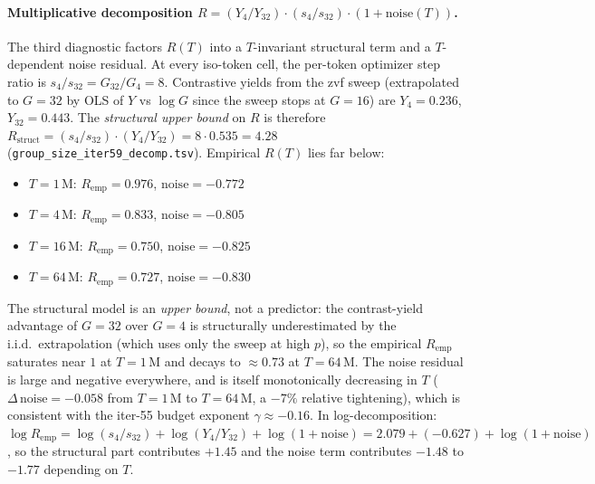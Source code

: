 \paragraph{Multiplicative decomposition $R = (Y_4/Y_{32}) \cdot (s_4/s_{32}) \cdot (1 + \mathrm{noise}(T))$.}
The third diagnostic factors $R(T)$ into a $T$-invariant structural
term and a $T$-dependent noise residual.  At every iso-token cell,
the per-token optimizer step ratio is
$s_4/s_{32} = G_{32}/G_4 = 8$.  Contrastive yields from the zvf
sweep (extrapolated to $G{=}32$ by OLS of $Y$ vs $\log G$ since the
sweep stops at $G{=}16$) are $Y_4 = 0.236$, $Y_{32} = 0.443$.  The
\emph{structural upper bound} on $R$ is therefore
$R_{\mathrm{struct}} = (s_4/s_{32}) \cdot (Y_4/Y_{32}) = 8 \cdot 0.535
= 4.28$ (\texttt{group\_size\_iter59\_decomp.tsv}).  Empirical
$R(T)$ lies far below:
\begin{itemize}
  \item $T = 1$\,M: $R_{\mathrm{emp}} = 0.976$, $\mathrm{noise} = -0.772$
  \item $T = 4$\,M: $R_{\mathrm{emp}} = 0.833$, $\mathrm{noise} = -0.805$
  \item $T = 16$\,M: $R_{\mathrm{emp}} = 0.750$, $\mathrm{noise} = -0.825$
  \item $T = 64$\,M: $R_{\mathrm{emp}} = 0.727$, $\mathrm{noise} = -0.830$
\end{itemize}
The structural model is an \emph{upper bound}, not a predictor: the
contrast-yield advantage of $G{=}32$ over $G{=}4$ is structurally
underestimated by the i.i.d.\ extrapolation (which uses only the
sweep at high $p$), so the empirical $R_{\mathrm{emp}}$ saturates
near $1$ at $T{=}1$\,M and decays to $\approx 0.73$ at $T{=}64$\,M.
The noise residual is large and negative everywhere, and is itself
monotonically decreasing in $T$ ($\Delta\,\mathrm{noise} = -0.058$
from $T{=}1$\,M to $T{=}64$\,M, a $-7\%$ relative tightening), which
is consistent with the iter-55 budget exponent $\gamma \approx
-0.16$.  In log-decomposition:
$\log R_{\mathrm{emp}} = \log(s_4/s_{32}) + \log(Y_4/Y_{32}) +
\log(1+\mathrm{noise}) = 2.079 + (-0.627) + \log(1+\mathrm{noise})$,
so the structural part contributes $+1.45$ and the noise term
contributes $-1.48$ to $-1.77$ depending on $T$.

